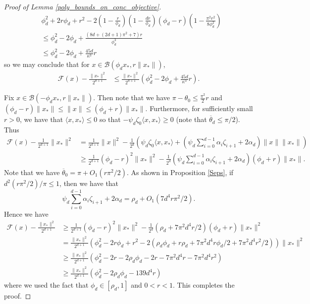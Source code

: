 \documentclass[11pt]{article}
\newcommand{\al}{\alpha}
\theoremstyle{remark}
\begin{document}
\begin{proof}[Proof of Lemma \ref{poly_bounds_on_conc_objective}]
\begin{align*}
    & \phi_d^2 + 2r\phi_d + r^2 - 2 \left(1 - \frac{r}{\phi_d}\right)\left(1 - \frac{dr}{\phi_d}\right)(\phi_d - r)\left(1 - \frac{\pi^2r^2}{8\phi_d^2}\right) \\
    & \leqslant \phi_d^2 - 2\phi_d + \frac{(8d + (2d+1)\pi^2 + 7)r}{\phi_d^3} \\
    & \leqslant \phi_d^2 - 2\phi_d + \frac{45d}{\kappa^3}r
\end{align*} so we may conclude that for $x \in \mathcal{B}(\phi_d x_*, r\|x_*\|)$, \begin{align*}
    \mathcal{F}(x) - \frac{\|x_*\|^2}{2^{d+1}} & \leqslant \frac{\|x_*\|^2}{2^{d+1}}\left(\phi_d^2 - 2\phi_d + \frac{45d}{\kappa^3}r\right). 
\end{align*}

Fix $x \in \mathcal{B}(-\phi_d x_*, r\|x_*\|)$. Then note that we have $\pi - \theta_0 \leqslant \frac{\pi^2}{2}r$ and $(\phi_d - r)\|x_*\| \leqslant \|x\| \leqslant (\phi_d + r)\|x_*\|$. Furthermore, for sufficiently small $r > 0$, we have that $\langle x,x_*\rangle \leqslant 0$ so that $-\psi_d \zeta_0 \langle x,x_*\rangle \geqslant 0$ (note that $\overline{\theta}_d \leqslant \pi/2$). Thus \begin{align*}
    \mathcal{F}(x) - \frac{1}{2^{d+1}}\|x_*\|^2 & = \frac{1}{2^{d+1}}\|x\|^2 - \frac{1}{2^d}\left(\psi_d \zeta_0 \langle x,x_*\rangle + (\psi_d \sum_{i=0}^{d-1} \al_i \zeta_{i+1} + 2\al_d)\|x\|\|x_*\|\right) \\
    & \geqslant \frac{1}{2^{d+1}}(\phi_d - r)^2\|x_*\|^2 - \frac{1}{2^d}(\psi_d \sum_{i=0}^{d-1} \al_i \zeta_{i+1} + 2\al_d)(\phi_d + r)\|x_*\|.
\end{align*} Note that we have $\overline{\theta}_0 = \pi + O_1(r\pi^2/2)$. As shown in Proposition \ref{Seps}, if $d^2(r\pi^2/2)/\pi \leqslant 1$, then we have that  $$\psi_d \sum_{i=0}^{d-1} \al_i \zeta_{i+1} + 2\al_d = \rho_d + O_1(7d^4r\pi^2/2).$$ Hence we have\begin{align*}
    \mathcal{F}(x) - \frac{\|x_*\|^2}{2^{d+1}} & \geqslant \frac{1}{2^{d+1}}(\phi_d - r)^2\|x_*\|^2 - \frac{1}{2^d}(\rho_d + 7\pi^2d^4r/2)(\phi_d + r)\|x_*\|^2 \\
    & = \frac{\|x_*\|^2}{2^{d+1}}(\phi_d^2 - 2r\phi_d + r^2 - 2(\rho_d\phi_d + r\rho_d + 7\pi^2d^4r\phi_d/2 + 7\pi^2d^4r^2/2))\|x_*\|^2 \\
    & \geqslant \frac{\|x_*\|^2}{2^{d+1}}(\phi_d^2 - 2r - 2\rho_d\phi_d -2r -7\pi^2d^4r -7\pi^2d^4r^2)\\
    & \geqslant \frac{\|x_*\|^2}{2^{d+1}}(\phi_d^2 - 2\rho_d \phi_d - 139d^4r)
\end{align*} where we used the fact that $\phi_d \in [\rho_d , 1]$ and $0 < r < 1.$ This completes the proof.
\end{proof}
\end{document}
